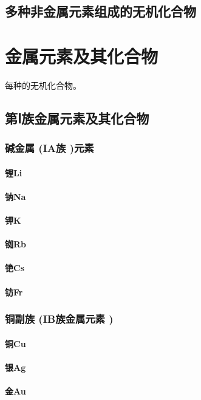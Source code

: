 \documentclass[UTF8]{../03-Chemistry}
\begin{document}
\section{多种非金属元素组成的无机化合物}


\chapter{金属元素及其化合物}
每种的无机化合物。
\section{第Ⅰ族金属元素及其化合物}
    \subsection{碱金属 (IA族 )元素}
        \subsubsection{锂Li}
        \subsubsection{钠Na}
        \subsubsection{钾K}
        \subsubsection{铷Rb}
        \subsubsection{铯Cs}
        \subsubsection{钫Fr}
    \subsection{铜副族 (IB族金属元素 )}
        \subsubsection{铜Cu}
        \subsubsection{银Ag}
        \subsubsection{金Au}
\end{document}

